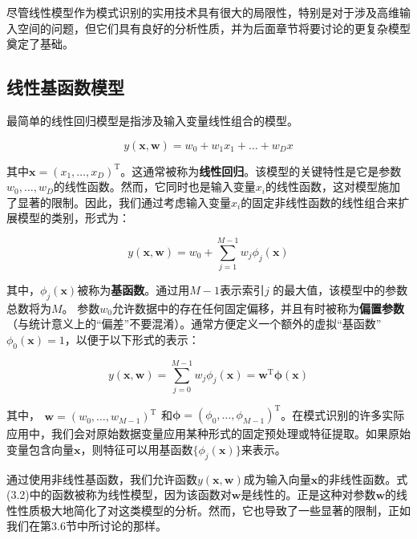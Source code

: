 \documentclass[a4paper]{article}
\begin{document}
尽管线性模型作为模式识别的实用技术具有很大的局限性，特别是对于涉及高维输入空间的问题，但它们具有良好的分析性质，并为后面章节将要讨论的更复杂模型奠定了基础。

\subsection{线性基函数模型}

最简单的线性回归模型是指涉及输入变量线性组合的模型。

\begin{equation}
	y(\mathbf{x},\mathbf{w})=w_0+w_1x_1+\ldots+w_Dx \tag{3.1}
\end{equation}

其中$\mathbf{x}=(x_1,\ldots,x_D)^\mathrm{T}$。这通常被称为\textbf{线性回归}。该模型的关键特性是它是参数$w_0,\ldots,w_D$的线性函数。然而，它同时也是输入变量$x_i$的线性函数，这对模型施加了显著的限制。因此，我们通过考虑输入变量$x_i$的固定非线性函数的线性组合来扩展模型的类别，形式为：

\begin{equation}
	y(\mathbf{x},\mathbf{w})=w_0+\sum_{j=1}^{M-1}w_j\phi_j(\mathbf{x}) \tag{3.2}
\end{equation}

其中，$\phi_j(\mathbf{x})$被称为\textbf{基函数}。通过用$M-1$表示索引$j$ 的最大值，该模型中的参数总数将为$M$。
参数$w_0$允许数据中的存在任何固定偏移，并且有时被称为\textbf{偏置参数}（与统计意义上的“偏差”不要混淆）。通常方便定义一个额外的虚拟“基函数” $\phi_0(\mathbf{x})=1$，以便于以下形式的表示：

\begin{equation}
y(\mathbf{x},\mathbf{w})=\sum_{j=0}^{M-1}w_j\phi_j(\mathbf{x})=\mathbf{w}^{\mathrm{T}}\boldsymbol{\phi}(\mathbf{x}) \tag{3.3}
\end{equation}

其中，$\begin{aligned}\mathbf{w}=(w_0,\ldots,w_{M-1})^\mathrm{T}\end{aligned}$和$\boldsymbol{\phi}=(\phi_{0},\ldots,\phi_{M-1})^{\mathrm{T}}$。在模式识别的许多实际应用中，我们会对原始数据变量应用某种形式的固定预处理或特征提取。如果原始变量包含向量$\mathbf{x}$，则特征可以用基函数$\{\phi_{j}(\mathbf{x})\}$来表示。

通过使用非线性基函数，我们允许函数$y(\mathbf{x},\mathbf{w})$成为输入向量$\mathbf{x}$的非线性函数。式(3.2)中的函数被称为线性模型，因为该函数对$\mathbf{w}$是线性的。正是这种对参数$\mathbf{w}$的线性性质极大地简化了对这类模型的分析。然而，它也导致了一些显著的限制，正如我们在第3.6节中所讨论的那样。
\end{document}
